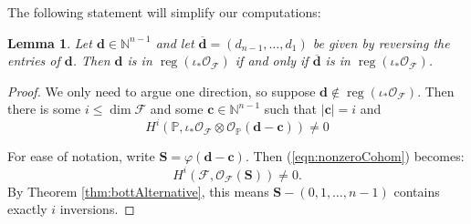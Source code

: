 \documentclass[12pt,reqno]{amsart}
\newtheorem{lemma}[theorem]{Lemma}
\theoremstyle{definition}
\theoremstyle{remark}
\newcommand{\reg}{\operatorname{reg}}
\newcommand{\calF}{{\mathcal{F}}}
\newcommand{\calO}{{\mathcal{O}}}
\begin{document}
The following statement will simplify our computations:

\begin{lemma}
\label{lemma:reverse}
    Let $\mathbf d \in \mathbb N^{n-1}$ and let $\overline{\mathbf d} = (d_{n-1},\ldots,d_1)$ be given by reversing the entries of $\mathbf d$.  Then $\mathbf d$ is in $\reg(\iota_*\calO_{\calF})$ if and only if $\overline{\mathbf d}$ is in $\reg(\iota_*\calO_{\calF})$.
\end{lemma}

\begin{proof}
    We only need to argue one direction, so suppose $\mathbf d \notin \reg(\iota_*\calO_{\calF})$. Then there is some $i \leq \dim \calF$ and some $\mathbf c \in \mathbb N^{n-1}$ such that $|\mathbf c| = i$ and 
    \begin{equation}\label{eqn:nonzeroCohom}
        H^i(\mathbb P,\iota_*\calO_{\calF}\otimes \calO_{\mathbb P}(\mathbf d-\mathbf c)) \neq 0
    \end{equation}
    
    For ease of notation, write $\mathbf S = \varphi(\mathbf d - \mathbf c)$.  Then (\ref{eqn:nonzeroCohom}) becomes:
    \begin{equation}\label{eqn:nonzeroCohom2}
        H^i(\calF,\calO_{\calF}(\mathbf S)) \neq 0.
    \end{equation}
    By Theorem \ref{thm:bottAlternative}, this means $\mathbf S - (0,1,\ldots,n-1)$ contains exactly $i$ inversions.  
    

\end{proof}
\end{document}

